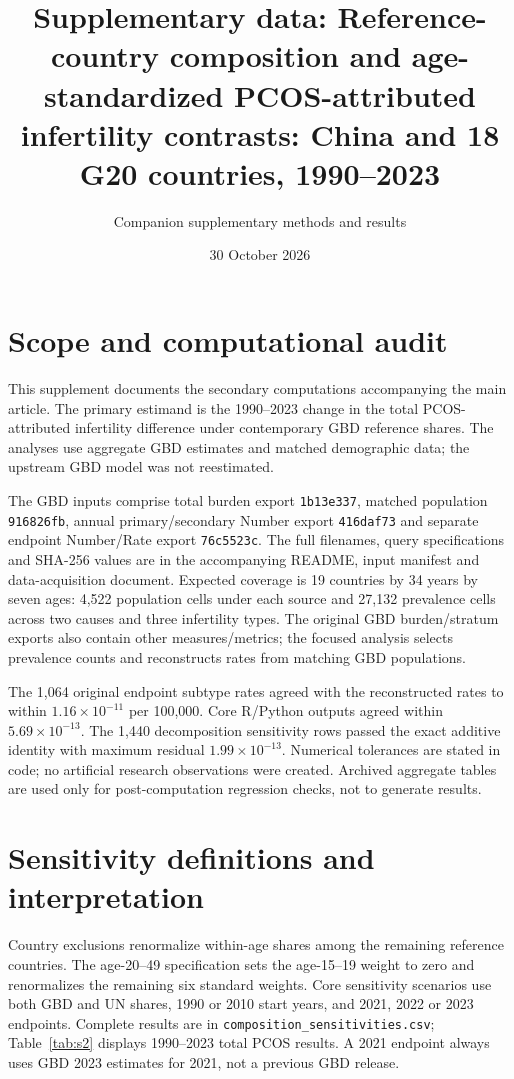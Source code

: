 \documentclass[11pt,a4paper]{article}
\title{Supplementary data: Reference-country composition and age-standardized PCOS-attributed infertility contrasts: China and 18 G20 countries, 1990--2023}
\author{Companion supplementary methods and results}
\date{30 October 2026}
\begin{document}
\maketitle\thispagestyle{fancy}
\renewcommand{\thetable}{S\arabic{table}}\setcounter{table}{0}
\renewcommand{\thefigure}{S\arabic{figure}}\setcounter{figure}{0}
\section{Scope and computational audit}
This supplement documents the secondary computations accompanying the main article. The primary estimand is the 1990--2023 change in the total PCOS-attributed infertility difference under contemporary GBD reference shares. The analyses use aggregate GBD estimates and matched demographic data; the upstream GBD model was not reestimated.

The GBD inputs comprise total burden export \texttt{1b13e337}, matched population \texttt{916826fb}, annual primary/secondary Number export \texttt{416daf73} and separate endpoint Number/Rate export \texttt{76c5523c}. The full filenames, query specifications and SHA-256 values are in the accompanying README, input manifest and data-acquisition document. Expected coverage is 19 countries by 34 years by seven ages: 4,522 population cells under each source and 27,132 prevalence cells across two causes and three infertility types. The original GBD burden/stratum exports also contain other measures/metrics; the focused analysis selects prevalence counts and reconstructs rates from matching GBD populations.

The 1,064 original endpoint subtype rates agreed with the reconstructed rates to within $1.16\times10^{-11}$ per 100,000. Core R/Python outputs agreed within $5.69\times10^{-13}$. The 1,440 decomposition sensitivity rows passed the exact additive identity with maximum residual $1.99\times10^{-13}$. Numerical tolerances are stated in code; no artificial research observations were created. Archived aggregate tables are used only for post-computation regression checks, not to generate results.

\section{Sensitivity definitions and interpretation}
Country exclusions renormalize within-age shares among the remaining reference countries. The age-20--49 specification sets the age-15--19 weight to zero and renormalizes the remaining six standard weights. Core sensitivity scenarios use both GBD and UN shares, 1990 or 2010 start years, and 2021, 2022 or 2023 endpoints. Complete results are in \texttt{composition\_sensitivities.csv}; Table~\ref{tab:s2} displays 1990--2023 total PCOS results. A 2021 endpoint always uses GBD 2023 estimates for 2021, not a previous GBD release.
\end{document}
